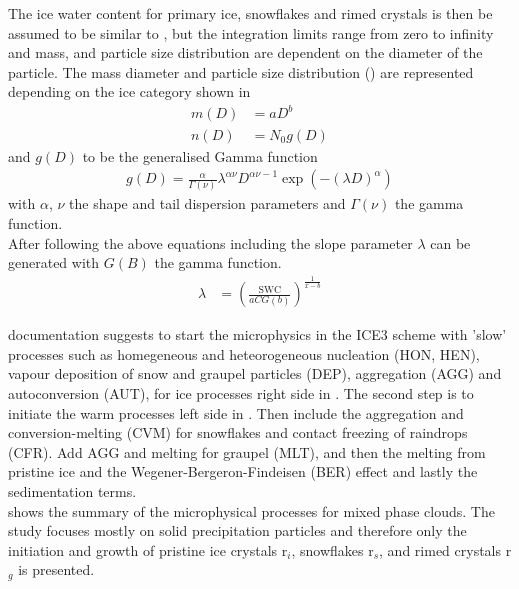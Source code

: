 The ice water content for primary ice, snowflakes and rimed crystals is then be assumed to be similar to , but the integration limits range from zero to infinity and mass, and particle size distribution are dependent on the diameter of the particle. The mass diameter and particle size distribution () are represented depending on the ice category shown in 
\begin{align}
	m(D) & = aD^b 	\label{eq:mass_diameter} \\
	n(D) & = N_0 g(D)	\label{eq:PSD_MEPS}
\end{align}
and $g(D)$ to be the generalised Gamma function 
\begin{align}
	g(D) = \frac{\alpha}{\Gamma(\nu)} \lambda^{\alpha \nu} D^{\alpha \nu -1} \exp\left( -(\lambda D)^\alpha \right)
\end{align}
with $\alpha$, $\nu$ the shape and tail dispersion parameters and $\Gamma(\nu)$ the gamma function. 
\\
After following the above equations including  the slope parameter $\lambda$ can be generated with $G(B)$ the gamma function.
\begin{align}
	\lambda & = \left( \frac{\text{SWC}}{aCG(b)}\right)^{\frac{1}{x-b}}
\end{align}
%

%

\newline
\cite{meteo_france_meso-nh_2009} documentation suggests to start the microphysics in the ICE3 scheme with 'slow' processes such as homegeneous and heteorogeneous nucleation (HON, HEN), vapour deposition of snow and graupel particles (DEP), aggregation (AGG) and autoconversion (AUT), for ice processes right side in . The second step is to initiate the warm processes left side in . Then include the aggregation and conversion-melting (CVM) for snowflakes and contact freezing of raindrops (CFR). Add AGG and melting for graupel (MLT), and then the melting from pristine ice  and the Wegener-Bergeron-Findeisen (BER) effect and lastly the sedimentation terms.  \\
 shows the summary of the microphysical processes for mixed phase clouds. The study focuses mostly on solid precipitation particles and therefore only the initiation and growth of pristine ice crystals r$_i$, snowflakes r$_s$, and rimed crystals r$_g$ is presented. 
